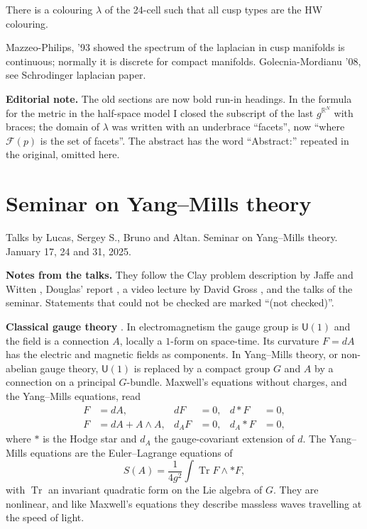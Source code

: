 \begin{theorem}
\label{theorem-ferrari-24-cell}
There is a colouring $\lambda$ of the 24-cell
such that all cusp types are the HW
colouring.
\end{theorem}

\begin{remark}
\label{remark-ferrari-spectrum}
Mazzeo-Philips, '93 showed the spectrum of
the laplacian in cusp manifolds is
continuous; normally it is discrete for
compact manifolds. Golecnia-Mordianu '08, see
Schrodinger laplacian paper.
\end{remark}

\medskip\noindent
{\bf Editorial note.}
The old sections are now bold run-in
headings. In the formula for the metric in
the half-space model I closed the subscript
of the last $g^{\mathbb{R}^N}$ with braces;
the domain of $\lambda$ was written with an
underbrace ``facets'', now ``where
$\mathcal{F}(p)$ is the set of facets''. The
abstract has the word ``Abstract:'' repeated
in the original, omitted here.


\section{Seminar on Yang--Mills theory}
\label{section-yang-mills-seminar}

\noindent
Talks by Lucas, Sergey S., Bruno and Altan.
Seminar on Yang--Mills theory.
January 17, 24 and 31, 2025.

\medskip\noindent
{\bf Notes from the talks.} They follow
the Clay problem description by Jaffe and
Witten \cite{yangmills}, Douglas' report
\cite{reportdouglas}, a video lecture by
David Gross \cite{gross-video}, and the
talks of the seminar. Statements that could
not be checked are marked
``(not checked)''.

\medskip\noindent
{\bf Classical gauge theory}
\cite{yangmills}. In electromagnetism the
gauge group is $\mathsf{U}(1)$ and the field
is a connection $A$, locally a $1$-form on
space-time. Its curvature $F=dA$ has the
electric and magnetic fields as components.
In Yang--Mills theory, or non-abelian gauge
theory, $\mathsf{U}(1)$ is replaced by a
compact group $G$ and $A$ by a connection
on a principal $G$-bundle. Maxwell's
equations without charges, and the
Yang--Mills equations, read
$$
\begin{aligned}
F&=dA, & dF&=0, & d{*}F&=0,\\
F&=dA+A\wedge A, & d_AF&=0,
& d_A{*}F&=0,
\end{aligned}
$$
where $*$ is the Hodge star and $d_A$ the
gauge-covariant extension of $d$. The
Yang--Mills equations are the
Euler--Lagrange equations of
$$
S(A)=\frac{1}{4g^2}\int
\operatorname{Tr}F\wedge{*}F,
$$
with $\operatorname{Tr}$ an invariant
quadratic form on the Lie algebra of $G$.
They are nonlinear, and like Maxwell's
equations they describe massless waves
travelling at the speed of light.


